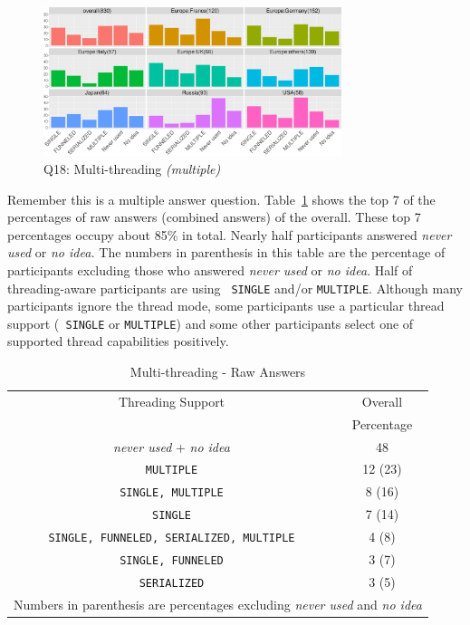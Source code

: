 \documentclass[preprint,5p,times]{elsarticle}
\def\myquote#1{{\it #1}}
\begin{document}
\begin{figure}[htb]
  \begin{center}
    \includegraphics[width=8.7cm]{R-scripts/Q18.pdf}
    \caption{Q18: Multi-threading {\it(multiple)}}
    \label{fig:multi-thread}
  \end{center}
\end{figure}

Remember this is a multiple answer
question. Table~\ref{tab:multi-thread-raw} shows the top 7 of the
percentages of raw answers (combined answers) of the
overall. These top 7 percentages occupy about 85\% in
total. Nearly half
participants answered \myquote{never used} or \myquote{no idea.} The
numbers in parenthesis in this table are the percentage of
participants excluding those who answered \myquote{never used} or
\myquote{no idea}. Half of threading-aware participants are using {\tt
  SINGLE}
and/or {\tt MULTIPLE}. Although many participants ignore the thread
mode, some participants use a particular thread support ({\tt
  SINGLE} or {\tt MULTIPLE}) and some other participants select one of
supported thread capabilities positively.

\begin{table}[htb]%
  \begin{center}%
    \caption{Multi-threading - Raw Answers}\label{tab:multi-thread-raw}%
    \begin{tabular}{c|c}%
      \hline%
      Threading Support & Overall \\
      & Percentage \\
      \hline%
      \myquote{never used} + \myquote{no idea} & 48 \\
              {\tt MULTIPLE} & 12 (23) \\
              {\tt SINGLE, MULTIPLE} & 8 (16) \\
              {\tt SINGLE} & 7 (14) \\
              {\tt SINGLE, FUNNELED, SERIALIZED, MULTIPLE} & 4 (8) \\
              {\tt SINGLE, FUNNELED} & 3 (7) \\
              {\tt SERIALIZED} & 3 (5) \\
              \hline%
              \multicolumn{2}{c}{\footnotesize Numbers in parenthesis are
                percentages excluding \myquote{never used} and \myquote{no
                  idea}}
    \end{tabular}%
  \end{center}%
\end{table}%
\end{document}
